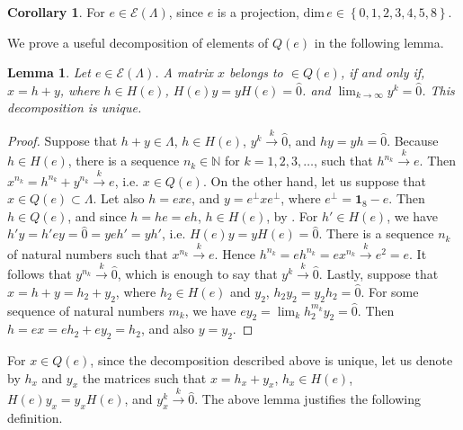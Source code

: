 \documentclass[12pt]{article}
\theoremstyle{plain}
\newtheorem{lemma}{Lemma}
\theoremstyle{definition}
\newtheorem{corollary}{Corollary}
\theoremstyle{remark}
\numberwithin{equation}{section}
\begin{document}
\begin{corollary}
\label{cor:q}
    For $e \in \mathcal{E}(\Lambda)$, since $e$ is a projection,
    $\text{dim} \, e 
    \in \left \{ 0,1,2,3,4,5,8 \right \}$.
\end{corollary}

We prove a useful decomposition of elements of $Q(e)$ in the following lemma.

\begin{lemma}
\label{lem:decomposition}
    Let $e \in \mathcal{E}(\Lambda)$.
    A matrix $x$ belongs to $\in Q(e)$, if and only if,
    $x = h + y$, where
    $h \in H(e)$, $H(e) y = y H(e) = \hat{0}$.
    and $\lim_{k \rightarrow \infty} y^{k} = \hat{0}$. 
    This decomposition is unique.
\end{lemma}
\begin{proof}
    Suppose that $h + y \in \Lambda$, $h \in H(e)$, $y^{k}  \overset{k}{\rightarrow}  \hat{0}$,
    and $hy = yh = \hat{0}$.
    Because $h \in H(e)$, there is a sequence $n_{k} \in \mathbb{N}$ for $k =1,2,3,\ldots$,
    such that $h^{n_{k}} \overset{k}{\rightarrow} e$.
    Then $x^{n_{k}}  = h^{n_{k}} + y^{n_{k}}  \overset{k}{\rightarrow}  e$, i.e.
    $x \in Q(e)$.
    On the other hand,
    let us suppose that $x \in Q(e) \subset \Lambda$.
    Let also $h = e x e$, and $y = e^{\perp} x e^{\perp}$,
    where $e^{\perp} = \mathbf{1}_{8} - e$.
    Then $h \in Q(e)$, and since
    $h =  h e = e h$,
    $h \in H(e)$, by \cite[Theorem 8]{schwarz1955hausdorff}.
    For $h' \in H(e)$, we have
    $h' y = h' e y = \hat{0} = y e h' = yh'$,
    i.e. $H(e) y = y H (e) = \hat{0}$.
    There is a sequence $n_{k}$ of natural numbers such that
    $x^{n_{k}}  \overset{k}{\rightarrow}  e$.
    Hence
    $h^{n_{k}} = e h^{n_{k}}  = e x^{n_{k}}  \overset{k}{\rightarrow} e^{2}  = e$.
    It follows that $y^{n_{k}}  \overset{k}{\rightarrow}  \hat{0}$,
    which is enough to say that $y^{k} \overset{k}{\rightarrow} \hat{0}$.
    Lastly,
    suppose that $x = h + y = h_{2} + y_{2}$,
    where $h_{2} \in H(e)$ and $y_{2}$,
    $h_{2} y_{2} = y_{2} h_{2} = \hat{0}$.
    For some sequence of natural numbers $m_{k}$, we have
    $e y_{2} = \lim_{k} h_{2}^{m_{k}} y_{2} = \hat{0}$.
    Then $h = e x = e h_{2} + e y_{2} = h_{2}$, and also $y = y_{2}$.
\end{proof}

For $x \in Q(e)$, since the decomposition described above is unique,
let us denote by $h_{x}$ and $y_{x}$ the matrices such that
$x = h_{x} + y_{x}$,
$h_{x} \in H(e)$, $H(e) y_{x} = y_{x} H(e)$, and
$y_{x}^{k} \overset{k}{\rightarrow} \hat{0}$.
The above lemma justifies the following definition.
\end{document}

